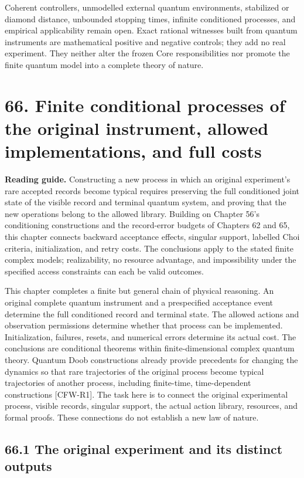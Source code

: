\documentclass[
  11pt,
  oneside]{book}
\begin{document}
Coherent controllers, unmodelled external quantum environments,
stabilized or diamond distance, unbounded stopping times, infinite
conditioned processes, and empirical applicability remain open. Exact
rational witnesses built from quantum instruments are mathematical
positive and negative controls; they add no real experiment. They
neither alter the frozen Core responsibilities nor promote the finite
quantum model into a complete theory of nature.

\chapter{66. Finite conditional processes of the original instrument,
allowed implementations, and full costs}\label{ch-66}

\textbf{Reading guide.} Constructing a new process in which an original
experiment's rare accepted records become typical requires preserving
the full conditioned joint state of the visible record and terminal
quantum system, and proving that the new operations belong to the
allowed library. Building on Chapter 56's conditioning constructions and
the record-error budgets of Chapters 62 and 65, this chapter connects
backward acceptance effects, singular support, labelled Choi criteria,
initialization, and retry costs. The conclusions apply to the stated
finite complex models; realizability, no resource advantage, and
impossibility under the specified access constraints can each be valid
outcomes.

This chapter completes a finite but general chain of physical reasoning.
An original complete quantum instrument and a prespecified acceptance
event determine the full conditioned record and terminal state. The
allowed actions and observation permissions determine whether that
process can be implemented. Initialization, failures, resets, and
numerical errors determine its actual cost. The conclusions are
conditional theorems within finite-dimensional complex quantum theory.
Quantum Doob constructions already provide precedents for changing the
dynamics so that rare trajectories of the original process become
typical trajectories of another process, including finite-time,
time-dependent constructions {[}CFW-R1{]}. The task here is to connect
the original experimental process, visible records, singular support,
the actual action library, resources, and formal proofs. These
connections do not establish a new law of nature.

\section{66.1 The original experiment and its distinct outputs}
\end{document}
